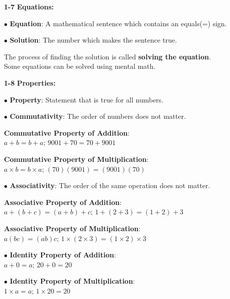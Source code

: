 \begin{enumerate*}
		\item[\Large\textbf{1-7}] \Large\textbf{Equations:}\\
			\begin{enumerate*}
				\item[$\bullet$]\textbf{Equation}: A mathematical sentence which contains an equals(=) sign.\\
				\item[$\bullet$]\textbf{Solution}: The number which makes the sentence true.\\
				\item[] The process of finding the solution is called \textbf{solving the equation}.\\
					Some equations can be solved using mental math.\\
			\end{enumerate*}
			
		\item[\Large\textbf{1-8}] \Large\textbf{Properties:}\\
			\begin{enumerate*}
				\item[$\bullet$]\textbf{Property}: Statement that is true for all numbers.\\
				\item[$\bullet$]\textbf{Commutativity}: The order of numbers does not matter.\\
					\item[]\textbf{Commutative Property of Addition}:\\
						$a+b=b+a$; $9001+70=70+9001$\\
					\item[]\textbf{Commutative Property of Multiplication}:\\
						$a\times b=b\times a$; $(70)(9001)=(9001)(70)$\\
					\item[$\bullet$]\textbf{Associativity}: The order of the same operation does not matter.\\
					\item[]\textbf{Associative Property of Addition}:\\
						$a+(b+c)=(a+b)+c$; $1+(2+3)=(1+2)+3$\\
					\item[]\textbf{Associative Property of Multiplication}:\\
						$a(bc)=(ab)c$; $1\times(2\times3)=(1\times2)\times3$\\
				\item[$\bullet$]\textbf{Identity Property of Addition}:\\
					$a+0=a$; $20+0=20$\\
				\item[$\bullet$]\textbf{Identity Property of Multiplication}:\\
					$1\times a=a$; $1\times20=20$\\


\end{enumerate*}
\end{enumerate*}
